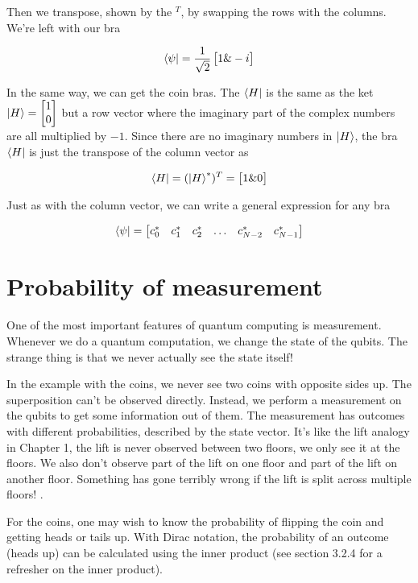 \documentclass{book}
\begin{document}
Then we transpose, shown by the $^T$, by swapping the rows with the columns. We're left with our bra

$$\bra{\psi} = \frac{1}{\sqrt{2}} \begin{bmatrix} 1 \& -i \end{bmatrix} $$


In the same way, we can get the coin bras. The $\bra{H}$ is the same as the ket $\ket{H} = \begin{bmatrix} 1 \\ 0 \end{bmatrix}$ but a row vector where the imaginary part of the complex numbers are all multiplied by $-1$. Since there are no imaginary numbers in $\ket{H}$, the bra $\bra{H}$ is just the transpose of the column vector as

$$
\bra{H} = (\ket{H}^*)^T = \begin{bmatrix} 1 \& 0 \end{bmatrix}
$$

Just as with the column vector, we can write a general expression for any bra

$$
\bra{\psi} = \begin{bmatrix} c_0^* & c_1^* & c_2^* & \dots & c_{N-2}^* & c_{N-1}^* \end{bmatrix}
$$


\section{ Probability of measurement}


One of the most important features of quantum computing is measurement. Whenever we do a quantum computation, we change the state of the qubits. The strange thing is that we never actually see the state itself! 

In the example with the coins, we never see two coins with opposite sides up. The superposition can't be observed directly. Instead, we perform a measurement on the qubits to get some information out of them. The measurement has outcomes with different probabilities, described by the state vector. It's like the lift analogy in Chapter 1, the lift is never observed between two floors, we only see it at the floors. We also don't observe part of the lift on one floor and part of the lift on another floor. Something has gone terribly wrong if the lift is split across multiple floors! 
. 

For the coins, one may wish to know the probability of flipping the coin and getting heads or tails up. With Dirac notation, the probability of an outcome (heads up) can be calculated using the inner product (see section 3.2.4 for a refresher on the inner product).
\end{document}
